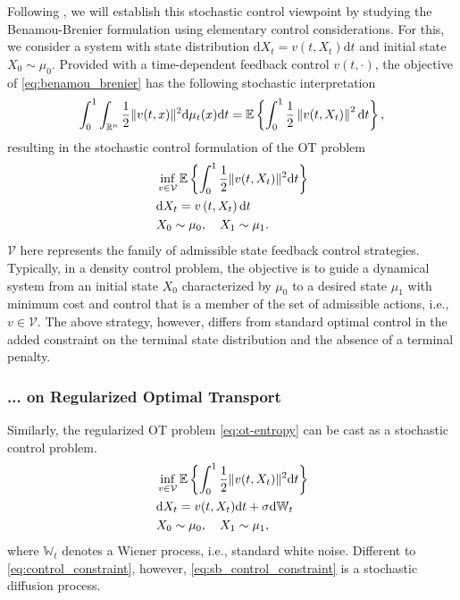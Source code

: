 Following \citet{chen2021optimal, chen2021stochastic}, we will establish this stochastic control viewpoint by studying the Benamou-Brenier formulation using elementary control considerations.
For this, we consider a system with state distribution $\mathrm{d}X_t=v\left(t, X_t\right)\mathrm{d}t$ and initial state $X_0 \sim \mu_0$. Provided with a time-dependent feedback control $v(t, \cdot)$, the objective of \eqref{eq:benamou_brenier} has the following stochastic interpretation
\begin{equation*}
	\int_0^1 \int_{\mathbb{R}^n} \frac{1}{2}\lVert v(t, x)\rVert^2 \mathrm{d}\mu_t(x) \mathrm{d}t = \mathbb{E}\left\{\int_0^1 \frac{1}{2}\left\|v(t, X_t)\right\|^2 \mathrm{d}t\right\},
\end{equation*}
resulting in the stochastic control formulation of the OT problem 
\begin{align}
& \inf _{v \in \mathcal{V}} \mathbb{E}\left\{\int_0^1 \frac{1}{2}\lVert v(t, X_t)\rVert^2 \mathrm{d}t\right\} \\
\label{eq:control_constraint} & \mathrm{d}X_t=v\left(t, X_t\right)\mathrm{d}t  \\
\nonumber & X_0 \sim \mu_0, \quad X_1 \sim \mu_1.
\end{align}
$\mathcal{V}$ here represents the family of admissible state feedback control strategies.
Typically, in a density control problem, the objective is to guide a dynamical system from an initial state $X_0$ characterized by $\mu_0$ to a desired state $\mu_1$ with minimum cost and control that is a member of the set of admissible actions, i.e., $v \in \mathcal{V}$. 
The above strategy, however, differs from standard optimal control in the added constraint on the terminal state distribution and the absence of a terminal penalty.


\subsubsection*{... on Regularized Optimal Transport}

Similarly, the regularized OT problem \eqref{eq:ot-entropy} can be cast as a stochastic control problem.
\begin{align}
\label{eq:sb_control}
& \inf _{v \in \mathcal{V}} \mathbb{E}\left\{\int_0^1 \frac{1}{2}\lVert v(t, X_t)\rVert^2 \mathrm{d} t\right\}\\
\label{eq:sb_control_constraint}
& \mathrm{d} X_t = v(t, X_t) \mathrm{d} t + \sigma \mathrm{d} \mathbb{W}_t \\
\nonumber & X_0 \sim \mu_0, \quad X_1 \sim \mu_1,
\end{align}
where $\mathbb{W}_t $ denotes a Wiener process, i.e., standard white noise. 
Different to \eqref{eq:control_constraint}, however, \eqref{eq:sb_control_constraint} is a stochastic diffusion process.

